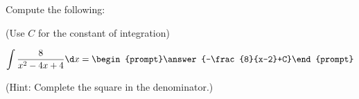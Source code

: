 \documentclass{ximera}
\author{Jim Talamo}
\begin{document}
\begin{exercise}
Compute the following:

\begin{prompt} (Use $C$ for the constant of integration) \end{prompt}

\[
\int \frac{8}{x^2-4x+4} \d x =
\begin{prompt}\answer{-\frac{8}{x-2}+C}\end{prompt} \\
\]

\begin{prompt} (Hint: Complete the square in the denominator.) \end{prompt}
\end{exercise}
\end{document}
